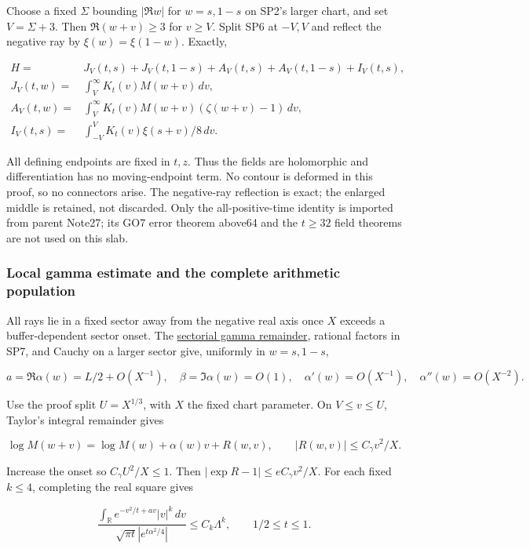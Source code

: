 Choose a fixed \(\Sigma\) bounding \(|\Re w|\) for \(w=s,1-s\) on SP2's larger chart, and set \(V=\Sigma+3\). Then \(\Re(w+v)\ge 3\) for \(v\ge V\). Split SP6 at \(-V,V\) and reflect the negative ray by \(\xi(w)=\xi(1-w)\). Exactly,

\[
\begin{split}
H={}&J_V(t,s)+J_V(t,1-s)+A_V(t,s)+A_V(t,1-s)+I_V(t,s),\\
J_V(t,w)={}&\int_V^\infty K_t(v)M(w+v)\,dv,\\
A_V(t,w)={}&\int_V^\infty K_t(v)M(w+v)(\zeta(w+v)-1)\,dv,\\
I_V(t,s)={}&\int_{-V}^V K_t(v)\xi(s+v)/8\,dv.
\end{split}
\tag{SP8}\label{eq:ansatz-sp8}
\]

All defining endpoints are fixed in \(t,z\). Thus the fields are holomorphic and differentiation has no moving-endpoint term. No contour is deformed in this proof, so no connectors arise. The negative-ray reflection is exact; the enlarged middle is retained, not discarded. Only the all-positive-time identity is imported from parent Note27; its GO7 error theorem above64 and the \(t\ge 32\) field theorems are not used on this slab.

\subsubsection{Local gamma estimate and the complete arithmetic population}
\label{subsec:sp-3}

All rays lie in a fixed sector away from the negative real axis once \(X\) exceeds a buffer-dependent sector onset. The \href{https://dlmf.nist.gov/5.11#ii}{sectorial gamma remainder}, rational factors in SP7, and Cauchy on a larger sector give, uniformly in \(w=s,1-s\),

\[
a=\Re\alpha(w)=L/2+O(X^{-1}),\quad
\beta=\Im\alpha(w)=O(1),\quad
\alpha'(w)=O(X^{-1}),\quad\alpha''(w)=O(X^{-2}).
\tag{SP9}\label{eq:ansatz-sp9}
\]

Use the proof split \(U=X^{1/3}\), with \(X\) the fixed chart parameter. On \(V\le v\le U\), Taylor's integral remainder gives

\[
\log M(w+v)=\log M(w)+\alpha(w)v+R(w,v),\qquad
|R(w,v)|\le C_\gamma v^2/X.
\tag{SP10}\label{eq:ansatz-sp10}
\]

Increase the onset so \(C_{\gamma} U^{2}/X\le 1\). Then \(|\exp R-1|\le e C_{\gamma} v^{2}/X\). For each fixed \(k\le 4\), completing the real square gives

\[
\frac{\int_{\mathbb R}e^{-v^2/t+av}|v|^k\,dv}
 {\sqrt{\pi t}|e^{t\alpha^2/4}|}
 \le C_k\Lambda^k,\qquad 1/2\le t\le1.
\tag{SP11}\label{eq:ansatz-sp11}
\]

